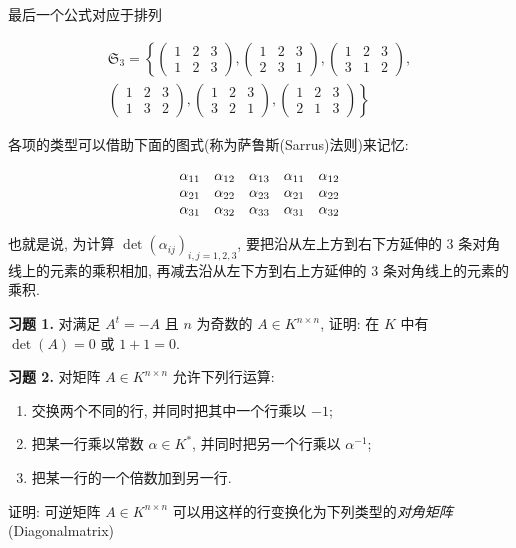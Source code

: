 最后一个公式对应于排列

\[
\begin{array}{c}
\mathfrak{S}_3 = \left\{\begin{pmatrix} 1 & 2 & 3 \\ 1 & 2 & 3 \end{pmatrix}, \begin{pmatrix} 1 & 2 & 3 \\ 2 & 3 & 1 \end{pmatrix}, \begin{pmatrix} 1 & 2 & 3 \\ 3 & 1 & 2 \end{pmatrix}, \right. \\
\left. \begin{pmatrix} 1 & 2 & 3 \\ 1 & 3 & 2 \end{pmatrix}, \begin{pmatrix} 1 & 2 & 3 \\ 3 & 2 & 1 \end{pmatrix}, \begin{pmatrix} 1 & 2 & 3 \\ 2 & 1 & 3 \end{pmatrix} \right\}
\end{array}
\]

各项的类型可以借助下面的图式(称为萨鲁斯(Sarrus)法则)来记忆:

\[
\begin{array}{c c c c c}
\alpha_{11} & \alpha_{12} & \alpha_{13} & \alpha_{11} & \alpha_{12} \\
\alpha_{21} & \alpha_{22} & \alpha_{23} & \alpha_{21} & \alpha_{22} \\
\alpha_{31} & \alpha_{32} & \alpha_{33} & \alpha_{31} & \alpha_{32}
\end{array}
\]

也就是说, 为计算 $\det(\alpha_{ij})_{i, j = 1, 2, 3}$, 要把沿从左上方到右下方延伸的 $3$ 条对角线上的元素的乘积相加, 再减去沿从左下方到右上方延伸的 $3$ 条对角线上的元素的乘积.

\aufgaben

\noindent\textbf{习题 1.} 对满足 $A^t = -A$ 且 $n$ 为奇数的 $A \in K^{n \times n}$, 证明: 在 $K$ 中有 $\det(A) = 0$ 或 $1 + 1 = 0$.

\medskip
\noindent\textbf{习题 2.} 对矩阵 $A \in K^{n \times n}$ 允许下列行运算:
\begin{enumerate}
\item[(i)] 交换两个不同的行, 并同时把其中一个行乘以 $-1$;
\item[(ii)] 把某一行乘以常数 $\alpha \in K^*$, 并同时把另一个行乘以 $\alpha^{-1}$;
\item[(iii)] 把某一行的一个倍数加到另一行.
\end{enumerate}
证明: 可逆矩阵 $A \in K^{n \times n}$ 可以用这样的行变换化为下列类型的\emph{对角矩阵}(\textup{Diagonalmatrix})

